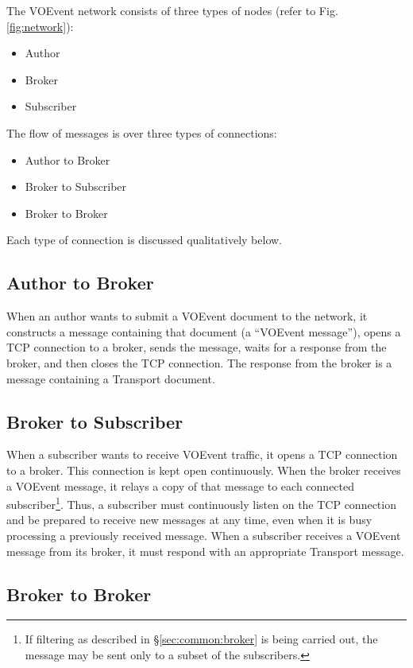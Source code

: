 \documentclass[a4paper,11pt]{ivoa}
\begin{document}
The VOEvent network consists of three types of nodes (refer to Fig.
\ref{fig:network}):

\begin{itemize}
    \item{Author}
    \item{Broker}
    \item{Subscriber}
\end{itemize}

The flow of messages is over three types of connections:

\begin{itemize}
    \item{Author to Broker}
    \item{Broker to Subscriber}
    \item{Broker to Broker}
\end{itemize}

Each type of connection is discussed qualitatively below.

\subsection{Author to Broker}

When an author wants to submit a VOEvent document to the network, it
constructs a message containing that document (a ``VOEvent message''), opens a
TCP connection to a broker, sends the message, waits for a response from the
broker, and then closes the TCP connection. The response from the broker is a
message containing a Transport document.

\subsection{Broker to Subscriber}

When a subscriber wants to receive VOEvent traffic, it opens a TCP connection
to a broker. This connection is kept open continuously. When the broker
receives a VOEvent message, it relays a copy of that message to each connected
subscriber\footnote{If filtering as described in \S\ref{sec:common:broker} is
being carried out, the message may be sent only to a subset of the
subscribers.}.  Thus, a subscriber must continuously listen on the TCP
connection and be prepared to receive new messages at any time, even when it
is busy processing a previously received message. When a subscriber receives a
VOEvent message from its broker, it must respond with an appropriate Transport
message.

\subsection{Broker to Broker}
\label{sec:node:brokertobroker}
\end{document}
